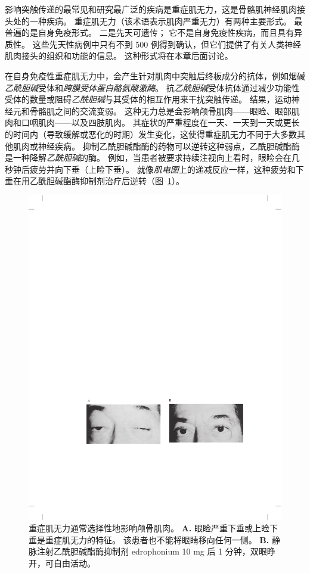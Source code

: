 影响突触传递的最常见和研究最广泛的疾病是重症肌无力，这是骨骼肌神经肌肉接头处的一种疾病。
重症肌无力（该术语表示肌肉严重无力）有两种主要形式。
最普遍的是自身免疫形式。
二是先天可遗传；
它不是自身免疫性疾病，而且具有异质性。
这些先天性病例中只有不到 500 例得到确认，但它们提供了有关人类神经肌肉接头的组织和功能的信息。
这种形式将在本章后面讨论。


在自身免疫性重症肌无力中，会产生针对肌肉中突触后终板成分的抗体，例如烟碱\textit{乙酰胆碱}受体和\textit{跨膜受体蛋白酪氨酸激酶}。
抗\textit{乙酰胆碱}受体抗体通过减少功能性受体的数量或阻碍\textit{乙酰胆碱}与其受体的相互作用来干扰突触传递。
结果，运动神经元和骨骼肌之间的交流变弱。
这种无力总是会影响颅骨肌肉——眼睑、眼部肌肉和口咽肌肉——以及四肢肌肉。
其症状的严重程度在一天、一天到一天或更长的时间内（导致缓解或恶化的时期）发生变化，这使得重症肌无力不同于大多数其他肌肉或神经疾病。
抑制乙酰胆碱酯酶的药物可以逆转这种弱点，乙酰胆碱酯酶是一种降解\textit{乙酰胆碱}的酶。
例如，当患者被要求持续注视向上看时，眼睑会在几秒钟后疲劳并向下垂（上睑下垂）。
就像\textit{肌电图}上的递减反应一样，这种疲劳和下垂在用乙酰胆碱酯酶抑制剂治疗后逆转（图~\ref{fig:57_7}）。


\begin{figure}[htbp]
	\centering
	\includegraphics[width=0.75\linewidth]{chap57/fig_57_7}
	\caption{重症肌无力通常选择性地影响颅骨肌肉。
		\textbf{A.} 眼睑严重下垂或上睑下垂是重症肌无力的特征。
		该患者也不能将眼睛移向任何一侧。
		\textbf{B.} 静脉注射乙酰胆碱酯酶抑制剂 edrophonium 10 mg 后 1 分钟，双眼睁开，可自由活动。}
	\label{fig:57_7}
\end{figure}


